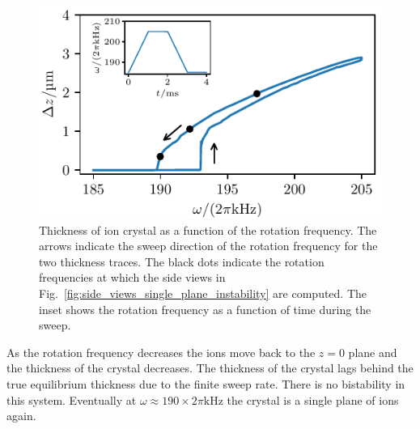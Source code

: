 \documentclass[aps, pra, preprint]{revtex4-1}
\begin{document}
\begin{figure}
  \includegraphics{./figures/fig_single_plane_instability.pdf}
  \caption{Thickness of ion crystal as a function of the rotation
    frequency. The arrows indicate the sweep direction of the
    rotation frequency for the two thickness traces. The black
    dots indicate the rotation frequencies at which the side
    views in Fig.~\ref{fig:side_views_single_plane_instability}
    are computed. The inset shows the rotation frequency as a
    function of time during the sweep.}
  \label{fig:single_plane_instability}
\end{figure}
As the rotation frequency decreases the ions move back to the
$z=0$ plane and the thickness of the crystal decreases. The
thickness of the crystal lags behind the true equilibrium
thickness due to the finite sweep rate. There is no bistability
in this system. Eventually at $\omega\approx 190\times
2\pi\si{\kilo\hertz}$ the crystal is a single plane of ions again.
\end{document}
